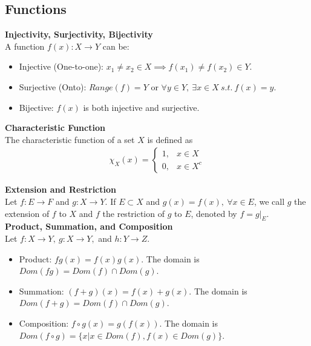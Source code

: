 \documentclass{article}
\numberwithin{theorem}{subsection}
\numberwithin{theorem}{subsubsection}
\numberwithin{lemma}{subsection}
\numberwithin{lemma}{subsubsection}
\theoremstyle{definition}
\numberwithin{definition}{subsection}
\numberwithin{definition}{subsubsection}
\begin{document}
\subsection{Functions}
\noindent \textbf{Injectivity, Surjectivity, Bijectivity} \\
\indent A function $f(x) : X \rightarrow Y$ can be:
\begin{itemize}
    \item Injective (One-to-one): $x_{1} \neq x_{2} \in X \implies f(x_{1}) \neq f(x_{2}) \in Y$.
    \item Surjective (Onto): $Range(f) = Y$ or $\forall y \in Y,\ \exists x \in X\ s.t.\ f(x) = y$.
    \item Bijective: $f(x)$ is both injective and surjective.\\
\end{itemize}

\noindent \textbf{Characteristic Function} \\
\indent The characteristic function of a set $X$ is defined as
\begin{gather*}
    \chi_{X}(x) =  \begin{cases} 
                      1, & x \in X \\
                      0, & x \in X^{c}
                   \end{cases}
\end{gather*}

\noindent \textbf{Extension and Restriction} \\
\indent Let $f : E \rightarrow F$ and $g : X \rightarrow Y$. If $E \subset X$ and $g(x) = f(x),\ \forall x \in E$, we call $g$ the extension of $f$ to $X$ and $f$ the restriction of $g$ to $E$, denoted by $f = g|_{E}$. \\

\noindent \textbf{Product, Summation, and Composition} \\
\indent Let $f : X \rightarrow Y,\ g : X \rightarrow Y,$ and $h : Y \rightarrow Z$.
\begin{itemize}
    \item Product: $fg(x) = f(x)g(x)$. The domain is $Dom(fg) = Dom(f) \cap Dom(g)$.
    \item Summation: $(f + g)(x) = f(x) + g(x)$. The domain is $Dom(f+g) = Dom(f) \cap Dom(g)$.
    \item Composition: $f \circ g(x) = g(f(x))$. The domain is $Dom(f \circ g) = \{x|x\in Dom(f), f(x) \in Dom(g)\}$.\\
\end{itemize}
\end{document}
